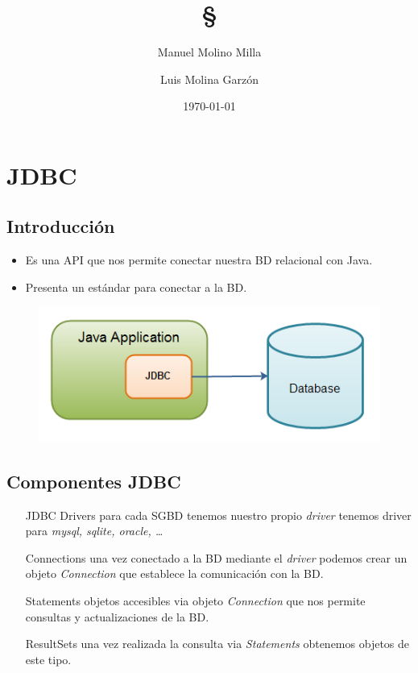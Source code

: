\documentclass[4paper]{article}
\author{Manuel Molino Milla \and Luis Molina Garzón}
\title{\textbf{\S}}
\date{\today}
\begin{document}
\maketitle 
\tableofcontents
\newpage


\section{JDBC}
\subsection{Introducción}
\begin{itemize}
\item Es una API que nos permite conectar nuestra BD relacional con Java. 
\item Presenta un estándar para conectar a la BD.
\end{itemize}
\begin{figure}[H]
\centering
\includegraphics[scale=0.5]{imagenes/jdbc.png}
\end{figure}


\subsection{Componentes JDBC}
\begin{enumerate}
\item[JDBC Drivers] para cada SGBD tenemos nuestro propio \emph{driver} tenemos driver para \emph{mysql, sqlite, oracle, \dots}
\item[Connections] una vez conectado a la BD mediante el \emph{driver} podemos crear un objeto \emph{Connection} que establece la comunicación con la BD.
\item[Statements] objetos accesibles via objeto \emph{Connection} que nos permite consultas y actualizaciones de la BD.
\item[ResultSets] una vez realizada la consulta via \emph{Statements} obtenemos objetos de este tipo.
\end{enumerate}
\end{document}
